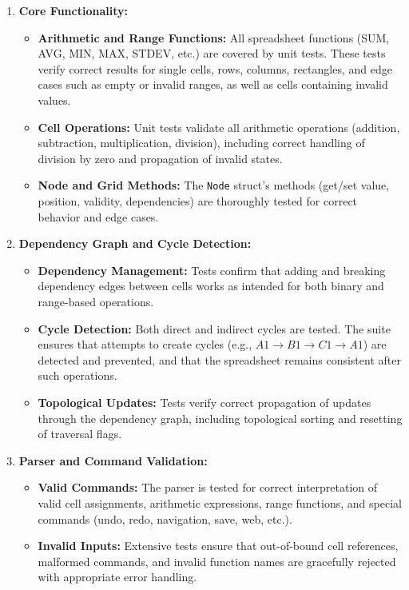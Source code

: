 \documentclass{article}
\begin{document}
\begin{enumerate}
    \item \textbf{Core Functionality:}
    \begin{itemize}
        \item \textbf{Arithmetic and Range Functions:} All spreadsheet functions (SUM, AVG, MIN, MAX, STDEV, etc.) are covered by unit tests. These tests verify correct results for single cells, rows, columns, rectangles, and edge cases such as empty or invalid ranges, as well as cells containing invalid values.
        \item \textbf{Cell Operations:} Unit tests validate all arithmetic operations (addition, subtraction, multiplication, division), including correct handling of division by zero and propagation of invalid states.
        \item \textbf{Node and Grid Methods:} The \texttt{Node} struct's methods (get/set value, position, validity, dependencies) are thoroughly tested for correct behavior and edge cases.
    \end{itemize}

    \item \textbf{Dependency Graph and Cycle Detection:}
    \begin{itemize}
        \item \textbf{Dependency Management:} Tests confirm that adding and breaking dependency edges between cells works as intended for both binary and range-based operations.
        \item \textbf{Cycle Detection:} Both direct and indirect cycles are tested. The suite ensures that attempts to create cycles (e.g., $A1 \rightarrow B1 \rightarrow C1 \rightarrow A1$) are detected and prevented, and that the spreadsheet remains consistent after such operations.
        \item \textbf{Topological Updates:} Tests verify correct propagation of updates through the dependency graph, including topological sorting and resetting of traversal flags.
    \end{itemize}

    \item \textbf{Parser and Command Validation:}
    \begin{itemize}
        \item \textbf{Valid Commands:} The parser is tested for correct interpretation of valid cell assignments, arithmetic expressions, range functions, and special commands (undo, redo, navigation, save, web, etc.).
        \item \textbf{Invalid Inputs:} Extensive tests ensure that out-of-bound cell references, malformed commands, and invalid function names are gracefully rejected with appropriate error handling.
    \end{itemize}


\end{enumerate}
\end{document}
